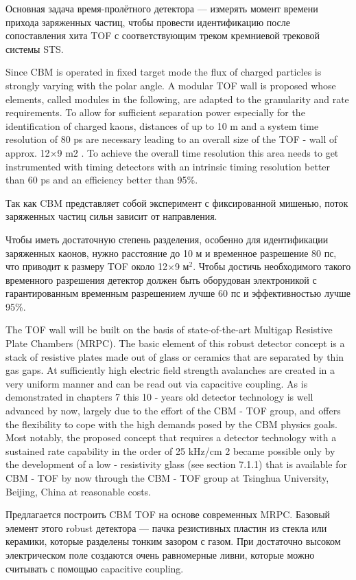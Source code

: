 Основная задача время-пролётного детектора --- измерять момент времени прихода заряженных частиц, чтобы провести идентификацию после сопоставления хита TOF с соответствующим треком кремниевой трековой системы STS.

Since CBM is operated in fixed target mode the flux of charged particles is strongly varying with the polar angle. A modular TOF wall is proposed whose elements, called modules in the following, are adapted to the granularity and rate requirements. To allow for sufficient separation power especially for the identification of charged kaons, distances of up to 10 m and a system time resolution of 80 ps are necessary leading to an overall size of the TOF - wall of approx. 12$\times$9 m2 . To achieve the overall time resolution this area needs to get instrumented with timing detectors with an intrinsic timing resolution better than 60 ps and an efficiency better than 95\%.

Так как CBM представляет собой эксперимент с фиксированной мишенью, поток заряженных частиц сильн зависит от направления.

Чтобы иметь достаточную степень разделения, особенно для идентификации заряженных каонов, нужно расстояние до 10 м и временное разрешение 80 пс, что приводит к размеру TOF около 12$\times$9 м$^2$. Чтобы достичь необходимого такого временного разрешения детектор должен быть оборудован электроникой с гарантированным временным разрешением лучше 60 пс и эффективностью лучше 95\%.

The TOF wall will be built on the basis of state-of-the-art Multigap Resistive Plate Chambers (MRPC). The basic element of this robust detector concept is a stack of resistive plates made out of glass or ceramics that are separated by thin gas gaps. At sufficiently high electric field strength avalanches are created in a very uniform manner and can be read out via capacitive coupling. As is demonstrated in chapters 7 this 10 - years old detector technology is well advanced by now, largely due to the effort of the CBM - TOF group, and offers the flexibility to cope with the high demands posed by the CBM physics goals. Most notably, the proposed concept that requires a detector technology with a sustained rate capability in the order of 25 kHz/cm 2 became possible only by the development of a low - resistivity glass (see section 7.1.1) that is available for CBM - TOF by now through the CBM - TOF group at Tsinghua University, Beijing, China at reasonable costs.

Предлагается построить CBM TOF на основе современных MRPC. Базовый элемент этого robust детектора --- пачка резистивных пластин из стекла или керамики, которые разделены тонким зазором с газом. При достаточно высоком электрическом поле создаются очень равномерные ливни, которые можно считывать с помощью capacitive coupling.

